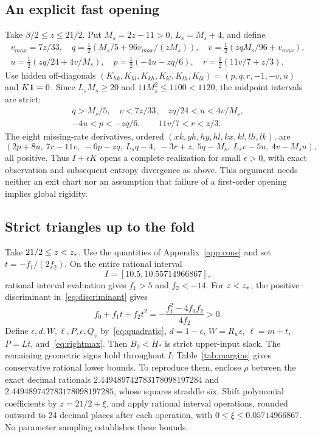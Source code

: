 \subsection{An explicit fast opening}
Take $\beta/2\le z\le21/2$. Put $M_s=2z-11>0$, $L_s=M_s+4$, and define
\begin{gather}
 v_{max}=7z/33,\quad
 q=\tfrac12\left(M_s/5+96v_{max}/(zM_s)\right),\quad
 v=\tfrac12\left(zqM_s/96+v_{max}\right),\\
 u=\tfrac12(zq/24+4v/M_s),\quad
 p=\tfrac12(-4u-zq/6),\quad
 r=\tfrac12(11v/7+z/3).
\end{gather}
Use hidden off-diagonals $(K_{hk},K_{hl},K_{kh},K_{kl},K_{lh},K_{lk})=(p,q,r,-1,-v,u)$ and $K\mathbf 1=0$. Since $L_sM_s\ge20$ and $11M_s^2\le1100<1120$, the midpoint intervals are strict:
\begin{gather}
 q>M_s/5,\quad v<7z/33,\quad zq/24<u<4v/M_s,\\
 -4u<p<-zq/6,\qquad11v/7<r<z/3.
\end{gather}
The eight missing-rate derivatives, ordered $(xk,yh,hy,hl,kx,kl,lh,lk)$, are
\begin{equation}
 (2p+8u,\ 7r-11v,\ -6p-zq,\ L_sq-4,\ -3r+z,\ 5q-M_s,\ L_sv-5u,\ 4v-M_su),
\end{equation}
all positive. Thus $I+\epsilon K$ opens a complete realization for small $\epsilon>0$, with exact observation and subsequent entropy divergence as above. This argument needs neither an exit chart nor an assumption that failure of a first-order opening implies global rigidity.

\subsection{Strict triangles up to the fold}
Take $21/2\le z<z_*$. Use the quantities of Appendix~\ref{app:cone} and set $t=-f_1/(2f_2)$. On the entire rational interval
\begin{equation}
 I=[10.5,10.55714966867],\label{eq:wholeinterval}
\end{equation}
rational interval evaluation gives $f_1>5$ and $f_2<-14$. For $z<z_*$, the positive discriminant in~\eqref{eq:discriminant} gives
\begin{equation}
 f_0+f_1t+f_2t^2=-\frac{f_1^2-4f_0f_2}{4f_2}>0.
\end{equation}
Define $\epsilon,d,W,\ell,P,c,Q_v$ by~\eqref{eq:quadratic}, $d=1-\epsilon$, $W=R_w\epsilon$, $\ell=m+t$, $P=Lt$, and~\eqref{eq:rightmax}. Then $B_0<H_*$ is strict upper-input slack. The remaining geometric signs hold throughout $I$; Table~\ref{tab:margins} gives conservative rational lower bounds. To reproduce them, enclose $\rho$ between the exact decimal rationals $2.449489742783178098197284$ and $2.449489742783178098197285$, whose squares straddle six. Shift polynomial coefficients by $z=21/2+\xi$, and apply rational interval operations, rounded outward to 24 decimal places after each operation, with $0\le\xi\le0.05714966867$. No parameter sampling establishes these bounds.

